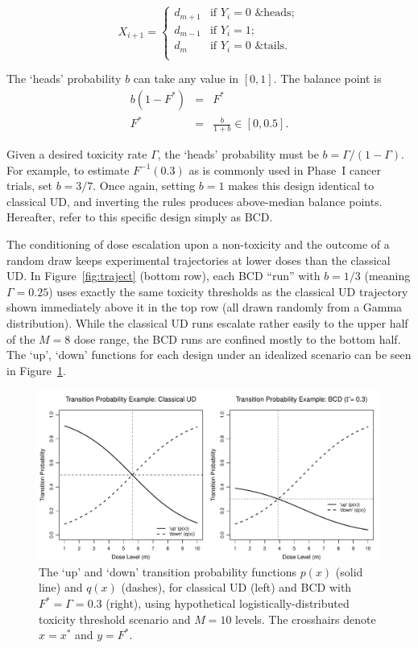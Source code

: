\begin{equation}\label{eq:DF_BCD}
X_{i+1}=
\begin{cases}
d_{m+1} &\textrm{if $Y_i=0$ \& heads};\\
d_{m-1} &\textrm{if $Y_i=1$};\\
d_m &\textrm{if $Y_i=0$ \& tails}.\\
\end{cases}
\end{equation}

The `heads' probability $b$ can take any value in $[0,1]$. The balance point is
\begin{equation}\label{eq:bcdx*}
\begin{array}{rcl}
    b\left(1-F^*\right) &=& F^*\\
    F^* &=& \frac{b}{1+b}\in[0,0.5].
\end{array}
\end{equation}

Given a desired toxicity rate $\Gamma$, the `heads' probability must be $b=\Gamma/(1-\Gamma)$. For example, to estimate $F^{-1}(0.3)$ as is commonly used in Phase~I cancer trials, set $b=3/7$. Once again, setting $b=1$ makes this design identical to classical UD, and inverting the rules produces above-median balance points. Hereafter, refer to this specific design simply as BCD.

The conditioning of dose escalation upon a non-toxicity and the outcome of a random draw keeps experimental trajectories at lower doses than the classical UD. In Figure~\ref{fig:traject} (bottom row), each BCD ``run'' with $b=1/3$ (meaning $\Gamma=0.25$) uses exactly the same toxicity thresholds as the classical UD trajectory shown immediately above it in the top row (all drawn randomly from a Gamma distribution). While the classical UD runs escalate rather easily to the upper half of the $M=8$ dose range, the BCD runs are confined mostly to the bottom half. The `up', `down' functions for each design under an idealized scenario can be seen in Figure~\ref{fig:pq}.

\begin{figure}
\begin{center}
\includegraphics[scale=0.55]{pqfig}
\caption{The `up' and `down' transition probability functions $p(x)$ (solid line) and $q(x)$ (dashes), for classical UD (left) and BCD with $F^*=\Gamma=0.3$ (right), using hypothetical logistically-distributed toxicity threshold scenario and $M=10$ levels. The crosshairs denote $x=x^*$ and $y=F^*$.}\label{fig:pq}
\end{center}
\end{figure}


